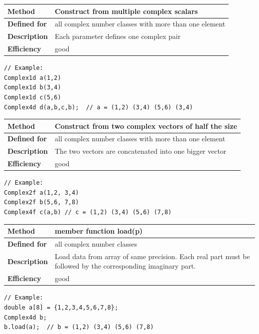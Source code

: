 \documentclass[11pt,a4paper,oneside,openright]{report}
\newcommand{\vspacesmall}{\vspace{3mm}}
\newcommand{\vspacebig}{\vspace{6mm}}
\begin{document}
\begin{tabular}{|p{25mm}|p{100mm}|}
\hline
\bfseries Method & Construct from multiple complex scalars \\ \hline
\bfseries Defined for & all complex number classes with more than one element \\ \hline
\bfseries Description & Each parameter defines one complex pair \\ \hline
\bfseries Efficiency & good \\ \hline
\end{tabular}
\vspacesmall

\begin{lstlisting}[frame=none]
// Example:
Complex1d a(1,2)
Complex1d b(3,4)
Complex1d c(5,6)
Complex4d d(a,b,c,b);  // a = (1,2) (3,4) (5,6) (3,4)
\end{lstlisting}
\vspacebig


\begin{tabular}{|p{25mm}|p{100mm}|}
\hline
\bfseries Method & Construct from two complex vectors of half the size \\ \hline
\bfseries Defined for & all complex number classes with more than one element \\ \hline
\bfseries Description & The two vectors are concatenated into one bigger vector \\ \hline
\bfseries Efficiency & good \\ \hline
\end{tabular}
\vspacesmall

\begin{lstlisting}[frame=none]
// Example:
Complex2f a(1,2, 3,4)
Complex2f b(5,6, 7,8)
Complex4f c(a,b) // c = (1,2) (3,4) (5,6) (7,8)
\end{lstlisting}
\vspacebig



\begin{tabular}{|p{25mm}|p{100mm}|}
\hline
\bfseries Method & member function load(p) \\ \hline
\bfseries Defined for & all complex number classes \\ \hline
\bfseries Description & Load data from array of same precision. 
Each real part must be followed by the corresponding imaginary part. \\ \hline
\bfseries Efficiency & good \\ \hline
\end{tabular}
\vspacesmall

\begin{lstlisting}[frame=none]
// Example:
double a[8] = {1,2,3,4,5,6,7,8};
Complex4d b;
b.load(a);  // b = (1,2) (3,4) (5,6) (7,8)
\end{lstlisting}
\vspacebig
\end{document}
